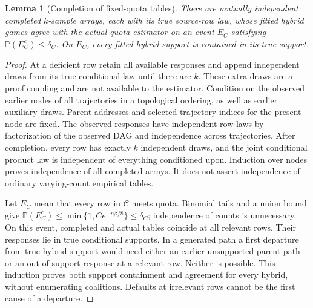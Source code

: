 \documentclass[11pt,a4paper]{article}
\numberwithin{equation}{section}
\newtheorem{lemma}[theorem]{Lemma}
\theoremstyle{definition}
\newcommand{\Prb}{\mathbb P}
\begin{document}
\begin{lemma}[Completion of fixed-quota tables]\label{lem:completion}
There are mutually independent completed $k$-sample arrays, each with
its true source-row law, whose fitted hybrid games agree with the actual
quota estimator on an event $E_C$ satisfying $\Prb(E_C^c)\le\delta_C$.
On $E_C$, every fitted hybrid support is contained in its true support.
\end{lemma}
\begin{proof}
At a deficient row retain all available responses and append independent
draws from its true conditional law until there are $k$. These extra
draws are a proof coupling and are not available to the estimator.
Condition on the observed earlier nodes of all trajectories in a
topological ordering, as well as earlier auxiliary draws. Parent addresses
and selected trajectory indices for the present node are fixed.
The observed responses have independent row laws by factorization of
the observed DAG and independence across trajectories. After completion,
every row has exactly $k$ independent draws, and the joint conditional
product law is independent of everything conditioned upon. Induction
over nodes proves independence of all completed arrays. It does not
assert independence of ordinary varying-count empirical tables.

Let $E_C$ mean that every row in $\mathcal C$ meets quota. Binomial
tails and a union bound give
$\Prb(E_C^c)\le\min\{1,C e^{-n\beta/8}\}\le\delta_C$; independence of counts
is unnecessary. On this event, completed and actual tables coincide
at all relevant rows. Their responses lie in true conditional supports.
In a generated path a first departure from true hybrid support would
need either an earlier unsupported parent path or an out-of-support
response at a relevant row. Neither is possible. This induction proves
both support containment and agreement for every hybrid, without
enumerating coalitions. Defaults at irrelevant rows cannot be the first
cause of a departure.
\end{proof}
\end{document}
